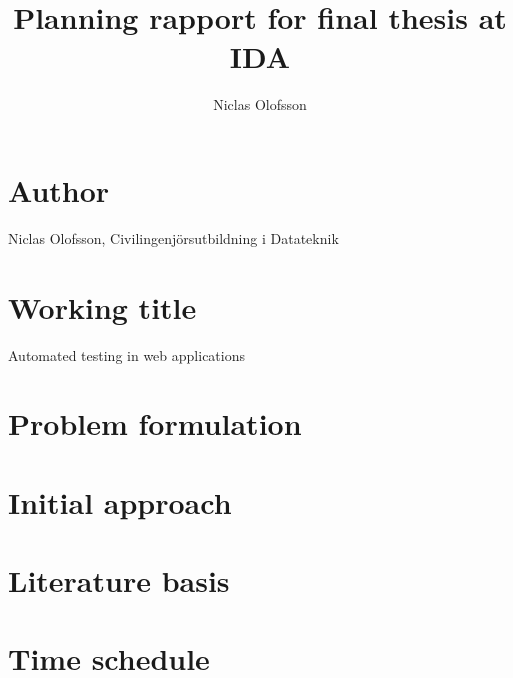 \documentclass[a4paper]{article}
\author{Niclas Olofsson}
\title{Planning rapport for final thesis at IDA}
\begin{document}
\maketitle

\section{Author}
Niclas Olofsson, Civilingenjörsutbildning i Datateknik

\section{Working title}
Automated testing in web applications

\section{Problem formulation}


\section{Initial approach}


\section{Literature basis}


\section{Time schedule}


%


\end{document}
